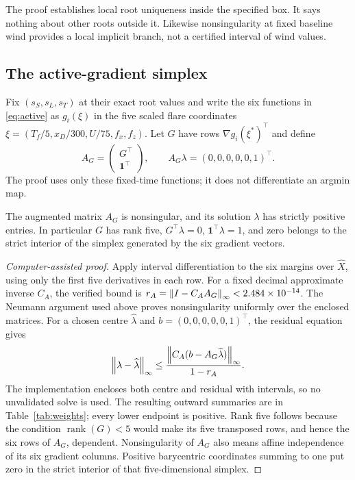 The proof establishes local root uniqueness inside the specified box. It says nothing about other roots outside it. Likewise nonsingularity at fixed baseline wind provides a local implicit branch, not a certified interval of wind values.

\subsection{The active-gradient simplex}
Fix $(s_S,s_L,s_T)$ at their exact root values and write the six functions in \eqref{eq:active} as $g_i(\xi)$ in the five scaled flare coordinates $\xi=(T_f/5,x_D/300,U/75,f_x,f_z)$. Let $G$ have rows $\nabla g_i(\xi^*)^\top$ and define
\begin{equation}\label{eq:simplex}
 A_G=\begin{pmatrix}G^\top\\\mathbf1^\top\end{pmatrix},\qquad
 A_G\lambda=(0,0,0,0,0,1)^\top.
\end{equation}
The proof uses only these fixed-time functions; it does not differentiate an argmin map.

\begin{lemma}\label{lem:simplex}
The augmented matrix $A_G$ is nonsingular, and its solution $\lambda$ has strictly positive entries. In particular $G$ has rank five, $G^\top\lambda=0$, $\mathbf1^\top\lambda=1$, and zero belongs to the strict interior of the simplex generated by the six gradient vectors.
\end{lemma}
\begin{proof}[Computer-assisted proof]
Apply interval differentiation to the six margins over $\widehat X$, using only the first five derivatives in each row. For a fixed decimal approximate inverse $C_A$, the verified bound is $r_A=\left\lVert I-C_AA_G\right\rVert_{\infty}<2.484\times10^{-14}$. The Neumann argument used above proves nonsingularity uniformly over the enclosed matrices. For a chosen centre $\widehat\lambda$ and $b=(0,0,0,0,0,1)^\top$, the residual equation gives
\begin{equation}\label{eq:neumann}
 \left\lVert\lambda-\widehat\lambda\right\rVert_{\infty}
 \leq\frac{\left\lVert C_A(b-A_G\widehat\lambda)\right\rVert_{\infty}}{1-r_A}.
\end{equation}
The implementation encloses both centre and residual with intervals, so no unvalidated solve is used. The resulting outward summaries are in Table~\ref{tab:weights}; every lower endpoint is positive. Rank five follows because the condition $\operatorname{rank}(G)<5$ would make its five transposed rows, and hence the six rows of $A_G$, dependent. Nonsingularity of $A_G$ also means affine independence of its six gradient columns. Positive barycentric coordinates summing to one put zero in the strict interior of that five-dimensional simplex.
\end{proof}

